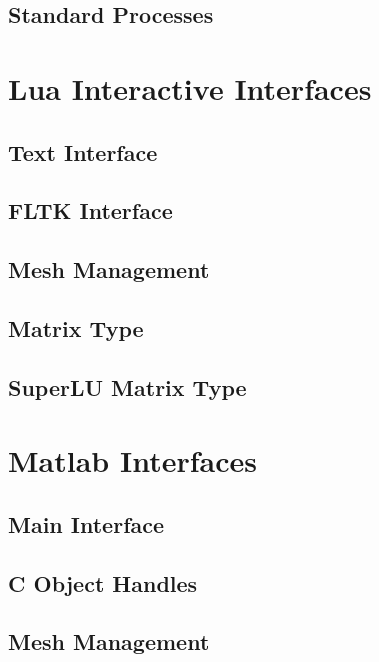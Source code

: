 \documentclass[10pt]{report}
\begin{document}
\chapter{Standard Processes}



\part{Lua Interactive Interfaces}

\chapter{Text Interface}


\chapter{FLTK Interface}


\chapter{Mesh Management}


\chapter{Matrix Type}


\chapter{SuperLU Matrix Type}



\part{Matlab Interfaces}

\chapter{Main Interface}


\chapter{C Object Handles}


\chapter{Mesh Management}

\end{document}
